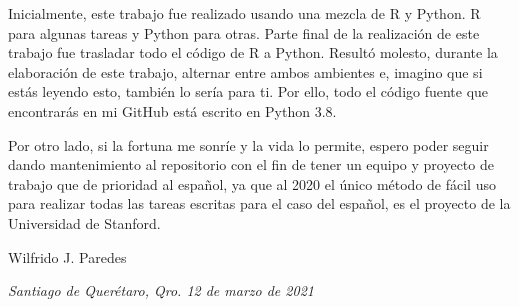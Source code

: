 Inicialmente, este trabajo fue realizado usando una mezcla de R y Python. R para algunas tareas y Python para otras. Parte final de la realización de este trabajo fue trasladar todo el código de R a Python. Resultó molesto, durante la elaboración de este trabajo, alternar entre ambos ambientes e, imagino que si estás leyendo esto, también lo sería para ti. Por ello, todo el código fuente que encontrarás en mi GitHub está escrito en Python 3.8.

Por otro lado, si la fortuna me sonríe y la vida lo permite, espero poder seguir dando mantenimiento al repositorio con el fin de tener un equipo y proyecto de trabajo que de prioridad al español, ya que al 2020 el único método de fácil uso para realizar todas las tareas escritas para el caso del español, es el proyecto de la Universidad de Stanford.

\begin{flushright}
	Wilfrido J. Paredes
\end{flushright}
\textit{\small Santiago de Querétaro, Qro. 12 de marzo de 2021}

 \vspace{4cm}

\singlespacing
 \tableofcontents

\listoftables

\listoffigures

\cleardoublepage


